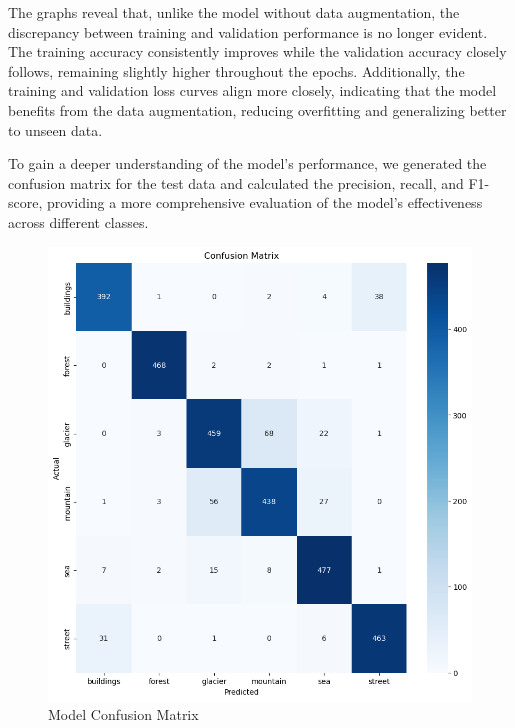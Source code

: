 The graphs reveal that, unlike the model without data augmentation, the discrepancy between training and validation performance is no longer evident. The training accuracy consistently improves while the validation accuracy closely follows, remaining slightly higher throughout the epochs. Additionally, the training and validation loss curves align more closely, indicating that the model benefits from the data augmentation, reducing overfitting and generalizing better to unseen data.

To gain a deeper understanding of the model's performance, we generated the confusion matrix for the test data and calculated the precision, recall, and F1-score, providing a more comprehensive evaluation of the model's effectiveness across different classes.


\begin{figure}[H]
    \centering
    \includegraphics[width=1\linewidth]{images/densenet_confusion_dataug.png}
    \caption{Model Confusion Matrix}
    \label{fig:enter-label}
\end{figure}
